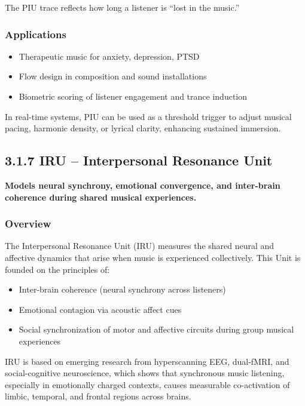 The PIU trace reflects how long a listener is “lost in the music.”

\subsubsection*{Applications}

\begin{itemize}
    \item Therapeutic music for anxiety, depression, PTSD
    \item Flow design in composition and sound installations
    \item Biometric scoring of listener engagement and trance induction
\end{itemize}

In real-time systems, PIU can be used as a threshold trigger to adjust musical pacing, harmonic density, or lyrical clarity, enhancing sustained immersion.

\subsection*{3.1.7 IRU – Interpersonal Resonance Unit}

\textbf{Models neural synchrony, emotional convergence, and inter-brain coherence during shared musical experiences.}

\subsubsection*{Overview}

The Interpersonal Resonance Unit (IRU) measures the shared neural and affective dynamics that arise when music is experienced collectively. This Unit is founded on the principles of:

\begin{itemize}
    \item Inter-brain coherence (neural synchrony across listeners)
    \item Emotional contagion via acoustic affect cues
    \item Social synchronization of motor and affective circuits during group musical experiences
\end{itemize}

IRU is based on emerging research from hyperscanning EEG, dual-fMRI, and social-cognitive neuroscience, which shows that synchronous music listening, especially in emotionally charged contexts, causes measurable co-activation of limbic, temporal, and frontal regions across brains.

